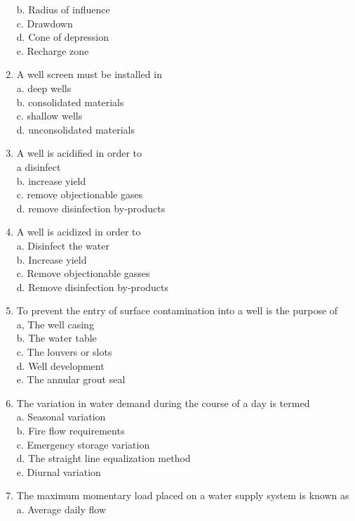\begin{enumerate}
b. Radius of influence\\
c. Drawdown\\
d. Cone of depression\\
e. Recharge zone\\
\item A well screen must be installed in\\
a. deep wells\\
b. consolidated materials\\
c. shallow wells\\
d. unconsolidated materials\\
\item A well is acidified in order to\\
a disinfect\\
b. increase yield\\
c. remove objectionable gases\\
d. remove disinfection by-products\\
\item A well is acidized in order to\\
a. Disinfect the water\\
b. Increase yield\\
c. Remove objectionable gasses\\
d. Remove disinfection by-products\\
\item To prevent the entry of surface contamination into a well is the purpose of\\
a, The well casing\\
b. The water table\\
c. The louvers or slots\\
d. Well development\\
e. The annular grout seal\\
\item The variation in water demand during the course of a day is termed\\
a. Seasonal variation\\
b. Fire flow requirements\\
c. Emergency storage variation\\
d. The straight line equalization method\\
e. Diurnal variation\\
\item The maximum momentary load placed on a water supply system is known as\\
a. Average daily flow\\

\end{enumerate}
